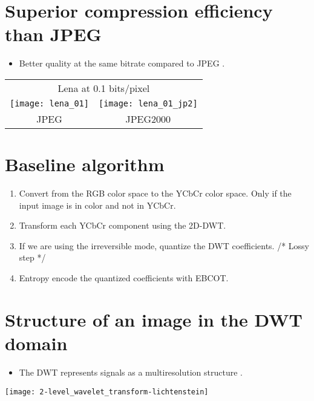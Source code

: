 \section{Superior compression efficiency than \gls{JPEG}}
\begin{itemize}
\item Better quality at the same bitrate compared to JPEG \cite{vruiz_J2K}.
\end{itemize}
\begin{center}
  \begin{tabular}{cc}
    \multicolumn{2}{c}{Lena at 0.1 bits/pixel} \\
    \texttt{[image: lena\_01]} & \texttt{[image: lena\_01\_jp2]} \\
    JPEG & JPEG2000
  \end{tabular}
\end{center}

\section{Baseline algorithm}
\begin{enumerate}
\item Convert from the \gls{RGB} color space to the \gls{YCbCr} color
  space. Only if the input image is in color and not in \gls{YCbCr}.
\item Transform each \gls{YCbCr} component using the 2D-\gls{DWT}.
\item If we are using the irreversible mode, quantize the \gls{DWT}
  coefficients. /* Lossy step */
\item Entropy encode the quantized coefficients with \gls{EBCOT}.
\end{enumerate}

\section{Structure of an image in the DWT domain}
\begin{itemize}
\item The \gls{DWT} represents signals as a multiresolution structure
  \cite{vruiz_J2K}.
\end{itemize}
\vspace{-2ex}
\begin{center}
  \texttt{[image: 2-level\_wavelet\_transform-lichtenstein]}
\end{center}

